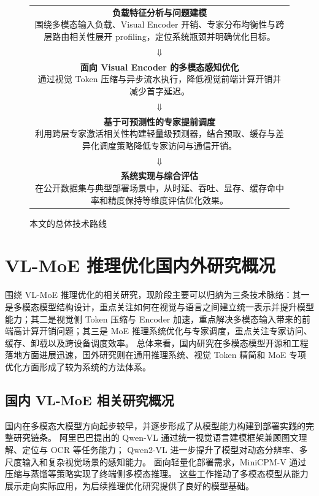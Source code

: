 \begin{figure}[!htbp]
\centering
\setlength{\fboxsep}{7pt}
\renewcommand{\arraystretch}{1.2}
\begin{tabular}{c}
\fbox{\parbox{0.82\textwidth}{\centering\textbf{负载特征分析与问题建模}\\
围绕多模态输入负载、Visual Encoder 开销、专家分布均衡性与跨层路由相关性展开 profiling，定位系统瓶颈并明确优化目标。}}\\[6pt]
$\Downarrow$\\[6pt]
\fbox{\parbox{0.82\textwidth}{\centering\textbf{面向 Visual Encoder 的多模态感知优化}\\
通过视觉 Token 压缩与异步流水执行，降低视觉前端计算开销并减少首字延迟。}}\\[6pt]
$\Downarrow$\\[6pt]
\fbox{\parbox{0.82\textwidth}{\centering\textbf{基于可预测性的专家提前调度}\\
利用跨层专家激活相关性构建轻量级预测器，结合预取、缓存与差异化调度策略降低专家访问与通信开销。}}\\[6pt]
$\Downarrow$\\[6pt]
\fbox{\parbox{0.82\textwidth}{\centering\textbf{系统实现与综合评估}\\
在公开数据集与典型部署场景中，从时延、吞吐、显存、缓存命中率和精度保持等维度评估优化效果。}}
\end{tabular}
\caption{本文的总体技术路线}
\label{fig:technical-roadmap}
\end{figure}

\section{VL-MoE 推理优化国内外研究概况}
围绕 VL-MoE 推理优化的相关研究，现阶段主要可以归纳为三条技术脉络：其一是多模态模型结构设计，重点关注如何在视觉与语言之间建立统一表示并提升模型能力；其二是视觉侧 Token 压缩与 Encoder 加速，重点解决多模态输入带来的前端高计算开销问题；其三是 MoE 推理系统优化与专家调度，重点关注专家访问、缓存、卸载以及跨设备调度效率。
总体来看，国内研究在多模态模型开源和工程落地方面进展迅速，国外研究则在通用推理系统、视觉 Token 精简和 MoE 专项优化方面形成了较为系统的方法体系。

\subsection{国内 VL-MoE 相关研究概况}
国内在多模态大模型方向起步较早，并逐步形成了从模型能力构建到部署实践的完整研究链条。
阿里巴巴提出的 Qwen-VL 通过统一视觉语言建模框架兼顾图文理解、定位与 OCR 等任务能力\cite{bai2023qwenvl}；
Qwen2-VL 进一步提升了模型对动态分辨率、多尺度输入和复杂视觉场景的感知能力\cite{wang2024qwen2vl}。
面向轻量化部署需求，MiniCPM-V 通过压缩与蒸馏等策略实现了终端侧多模态推理\cite{yao2024minicpmv}。
这些工作推动了多模态模型从能力展示走向实际应用，为后续推理优化研究提供了良好的模型基础。

